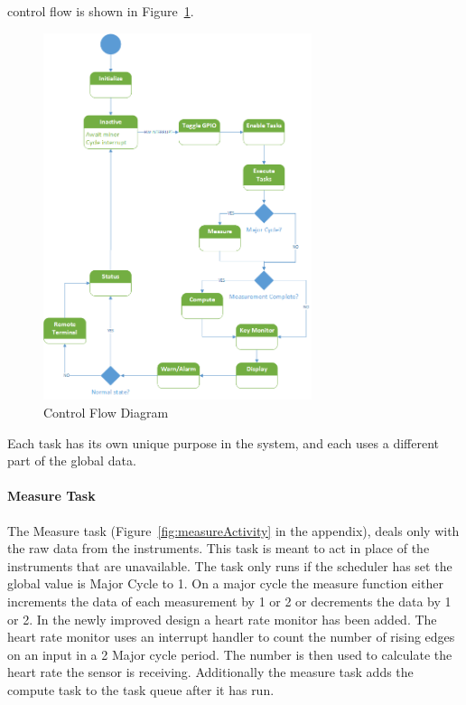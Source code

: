 \documentclass[12pt]{article} %
\begin{document}
    control flow is shown in Figure~\ref{fig:Control}. 

    \begin{figure}[h]
      \centering
      \includegraphics[width=0.7\textwidth]{../design/Control_state_diagram.png}
      \caption{Control Flow Diagram}
      \label{fig:Control}
    \end{figure}

    Each task has its own unique purpose in the system, and each uses a different
    part of the global data.

    \paragraph{Measure Task} The Measure task (Figure~\ref{fig:measureActivity}
    in the appendix), deals only with the raw data from the instruments. This
    task is meant to act in place of the instruments that are unavailable. The
    task only runs if the scheduler has set the global value is Major Cycle to
    1. On a major cycle the measure function either increments the data of each
    measurement by 1 or 2 or decrements the data by 1 or 2. In the newly
    improved design a heart rate monitor has been added. The heart rate monitor
    uses an interrupt handler to count the number of rising edges on an input
    in a 2 Major cycle period. The number is then used to calculate the heart
    rate the sensor is receiving. Additionally the measure task adds the
    compute task to the task queue after it has run.
\end{document}
